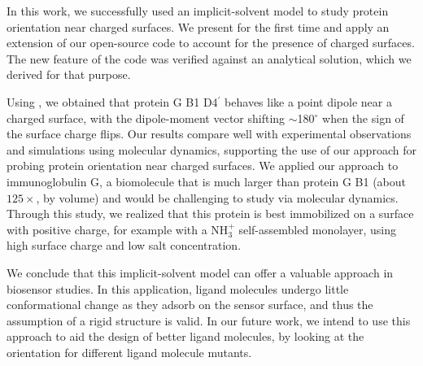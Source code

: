 
In this work, we successfully used an implicit-solvent model to study protein orientation near charged surfaces. We present for the first time and apply an extension of our open-source \pygbe code to account for the presence of charged surfaces. The new feature of the code was verified against an analytical solution, which we derived for that purpose. 

Using \pygbe, we obtained that protein G B1 D4$^\prime$ behaves like a point dipole near a charged surface, with the dipole-moment vector shifting $\sim$180$^\circ$ when the sign of the surface charge flips. Our results compare well with experimental observations and simulations using molecular dynamics, supporting the use of our approach for probing protein orientation near charged surfaces.
We applied our approach to immunoglobulin G, a biomolecule that is much larger than protein G B1 (about $125\times$, by volume) and would be challenging  to study via molecular dynamics. Through this study, we realized that this protein is best immobilized on a surface with positive charge, for example with a NH$^+_3$ self-assembled monolayer, using high surface charge and low salt concentration. 

We conclude that this implicit-solvent model can offer a valuable approach in biosensor studies. In this application, ligand molecules undergo little conformational change as they adsorb on the sensor surface, and thus the assumption of a rigid structure is valid. In our future work, we intend to use this approach to aid the design of better ligand molecules, by looking at the orientation for different ligand molecule mutants. 